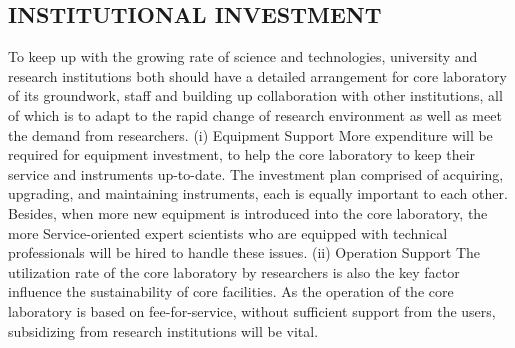 \documentclass[12pt]{article}
\begin{document}
\subsection{INSTITUTIONAL INVESTMENT}
To keep up with the growing rate of science and technologies, university and research institutions both should have a detailed arrangement for core laboratory of its groundwork, staff and building up collaboration with other institutions, all of which is to adapt to the rapid change of research environment as well as meet the demand from researchers.
(i) Equipment Support 
More expenditure will be required for equipment investment, to help the core laboratory to keep their service and instruments up-to-date. The investment plan comprised of acquiring, upgrading, and maintaining instruments, each is equally important to each other. Besides, when more new equipment is introduced into the core laboratory, the more Service-oriented expert scientists who are equipped with technical professionals will be hired to handle these issues.
(ii) Operation Support 
The utilization rate of the core laboratory by researchers is also the key factor influence the sustainability of core facilities. As the operation of the core laboratory is based on fee-for-service, without sufficient support from the users, subsidizing from research institutions will be vital.
\end{document}
